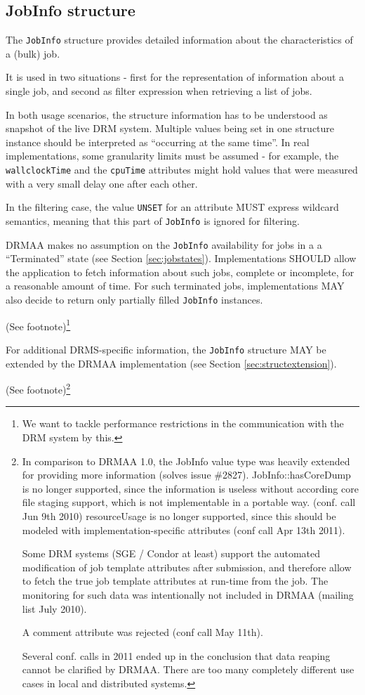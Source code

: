 \documentclass{article}
\newcommand{\h}[1]{\lstinline|#1|}
\newcommand{\rat}[1]{ {\tiny(See footnote)}\footnote{#1} }
\begin{document}
\subsection{JobInfo structure}
\label{sec:jobinfo}

The \h{JobInfo} structure provides detailed information about the characteristics of a (bulk) job.



It is used in two situations - first for the representation of information about a single job, and second as filter expression when retrieving a list of jobs.

In both usage scenarios, the structure information has to be understood as snapshot of the live DRM system. Multiple values being set in one structure instance should be interpreted as \enquote{occurring at the same time}. In real implementations, some granularity limits must be assumed - for example, the \h{wallclockTime} and the \h{cpuTime} attributes might hold values that were measured with a very small delay one after each other.

In the filtering case, the value \h{UNSET} for an attribute MUST express wildcard semantics, meaning that this part of \h{JobInfo} is ignored for filtering.

DRMAA makes no assumption on the \h{JobInfo} availability for jobs in a a \enquote{Terminated} state (see Section \ref{sec:jobstates}). Implementations SHOULD allow the application to fetch information about such jobs, complete or incomplete, for a reasonable amount of time. For such terminated jobs, implementations MAY also decide to return only partially filled \h{JobInfo} instances.

\rat{We want to tackle performance restrictions in the communication with the DRM system by this.}

For additional DRMS-specific information, the \h{JobInfo} structure MAY be extended by the DRMAA implementation (see Section \ref{sec:structextension}).

\rat{
In comparison to DRMAA 1.0, the JobInfo value type was heavily extended for providing more information (solves issue \#2827). JobInfo::hasCoreDump is no longer supported, since the information is useless without according core file staging support, which is not implementable in a portable way. (conf. call Jun 9th 2010) resourceUsage is no longer supported, since this should be modeled with implementation-specific attributes (conf call Apr 13th 2011).

Some DRM systems (SGE / Condor at least) support the automated modification of job template attributes after submission, and therefore allow to fetch the true job template attributes at run-time from the job. The monitoring for such data was intentionally not included in DRMAA (mailing list July 2010).

A comment attribute was rejected (conf call May 11th).

Several conf. calls in 2011 ended up in the conclusion that data reaping cannot be clarified by DRMAA. There are too many completely different use cases in local and distributed systems. 
}	
\end{document}
